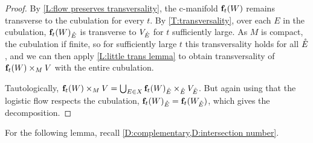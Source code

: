 \begin{proof}
	By \cref{L:flow preserves transversality}, the c-manifold $\mathbf{f}_t(W)$ remains transverse to the cubulation for every $t$.
	By \cref{T:transversality}, over each $E$ in the cubulation, $\mathbf{f}_t(W)_{\mathring{E}}$ is transverse to $V_{\mathring{E}}$ for $t$ sufficiently large.
	As $M$ is compact, the cubulation if finite, so for sufficiently large $t$ this transversality holds for all $\mathring{E}$, and we can then apply \cref{L:little trans lemma} to obtain transversality of $\mathbf{f}_t(W) \times_M V$ with the entire cubulation.

	Tautologically, $ \mathbf{f}_t(W) \times_M V = \bigcup_{E \in X} {\mathbf{f}_t(W)}_{\mathring{E}} \times_{\mathring{E}} V_{\mathring{E}}$.
	But again using that the logistic flow respects the cubulation, ${\mathbf{f}_t(W)}_{\mathring{E}} = {\mathbf{f}_t(W_{\mathring{E}})}$, which gives the decomposition.\qedhere
	\begin{comment}	That ${\f_t\left(W_{\E}\right)} \times_{\E} V_{\E}$ is itself a manifold with corners follows from the identification by \cref{L:little trans lemma} of $ {\f_t(W_{\E})} \times_{\E} V_{\E}$ with $(\f_t(W) \times_M V)\times_M \E$, the latter being a manifold with corners by our transversality result.
	\end{comment}
\end{proof}

For the following lemma, recall \cref{D:complementary,D:intersection number}.

